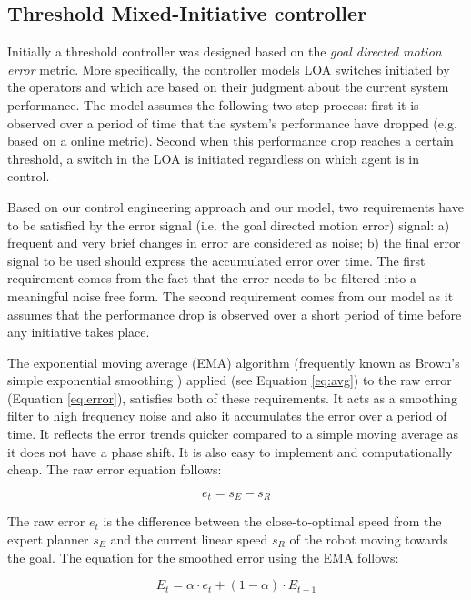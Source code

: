 \documentclass[a4paper,12pt,oneside,openright]{bhamthesis}
\begin{document}
\subsection{Threshold Mixed-Initiative controller}
\label{chapter5:threshold_controller}

Initially a threshold controller was designed based on the \textit{goal directed motion error} metric. More specifically, the controller models LOA switches initiated by the operators and which are based on their judgment about the current system performance. The model assumes the following two-step process: first it is observed over a period of time that the system's performance have dropped (e.g. based on a online metric). Second when this performance drop reaches a certain threshold, a switch in the LOA is initiated regardless on which agent is in control.

Based on our control engineering approach and our model, two requirements have to be satisfied by the error signal (i.e. the goal directed motion error) signal: a) frequent and very brief changes in error are considered as noise; b) the final error signal to be used should express the accumulated error over time. The first requirement comes from the fact that the error needs to be filtered into a meaningful noise free form. The second requirement comes from our model as it assumes that the performance drop is observed over a short period of time before any initiative takes place.

The exponential moving average (EMA) algorithm (frequently known as Brown's simple exponential smoothing \citep{Brown1963}) applied (see Equation \ref{eq:avg}) to the raw error (Equation \ref{eq:error}), satisfies both of these requirements. It acts as a smoothing filter to high frequency noise and also it accumulates the error over a period of time. It reflects the error trends quicker compared to a simple moving average as it does not have a phase shift. It is also easy to implement and computationally cheap. The raw error equation follows:

\begin{equation}\label{eq:error}
e_{t} = s_{E} - s_{R}
\end{equation}

The raw error $e_{t}$ is the difference between the close-to-optimal speed from the expert planner $s_{E}$ and the current linear speed $s_{R}$ of the robot moving towards the goal. The equation for the smoothed error using the EMA follows:

\begin{equation}\label{eq:avg}
E_{t} = \alpha \cdot e_{t} + (1-\alpha) \cdot E_{t-1}
\end{equation}
\end{document}
